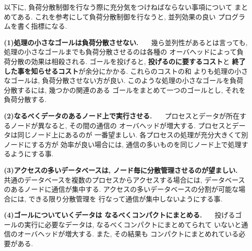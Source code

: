 \documentclass[a4,titlepage]{jsreport}
\let\dg\bf
\begin{document}
以下に, 負荷分散制御を行なう際に充分気をつけねばならない事項について
まとめてある.  これを参考にして負荷分散制御を行なうと, 並列効果の良い
プログラムを書く指標になる.  


\begin{description}
\item {\bf (1)}{\dg 処理の小さなゴールは負荷分散させない.  \ \ }
幾ら並列性があるとは言っても, 処理の小さなゴールまでも負荷分散させるのは各種の
オーバヘッドによって負荷分散の効果は相殺される.  
ゴールを投げると, {\dg 投げるのに要するコスト}と
{\dg 終了した事を知らせるコスト}が余分にかかる.  これらのコストの和
よりも処理の小さなゴールは, 負荷分散させない方が良い.  
このような処理の小さなゴールを負荷分散するには, 幾つかの関連のある
ゴールをまとめて一つのゴールとし, それを負荷分散する.  


\item {\bf (2)}{\dg なるべくデータのあるノード上で実行させる.  \ \ }
プロセスとデータが所在するノードが異なると, その間の通信の
オーバヘッドが増大する.  プロセスとデータは同じノード上にあるのが
一番望ましい.  各プロセスの処理が充分大きくて別ノードにする方が
効率が良い場合には, 
通信の多いものを同じノード上で処理するようにする事.  


\item {\bf (3)}{\dg アクセスの多いデータベースは, 
ノード毎に分散管理させるのが望ましい.  \ \ }
共通のデータベースを複数のプロセスからアクセスする場合には, 
データベースのあるノードに通信が集中する.  
アクセスの多いデータベースの分割が可能な場合には, できる限り分散管理を
行なって通信が集中しないようにする事.  


\item {\bf (4)}{\dg ゴールについていくデータは
なるべくコンパクトにまとめる.  \ \ }
投げるゴールの実行に必要なデータは, なるべくコンパクトにまとめてられて
いないと通信のオーバヘッドが増大する.  また, その結果も
コンパクトにまとめれている必要がある.  
\end{description}
\end{document}
